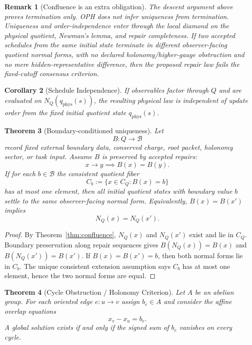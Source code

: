 \documentclass[11pt]{article}
\newtheorem{theorem}{Theorem}[section]
\newtheorem{corollary}[theorem]{Corollary}
\newtheorem{remark}[theorem]{Remark}
\begin{document}
\begin{remark}[Confluence is an extra obligation]
The descent argument above proves termination only. OPH does not infer uniqueness from termination.
Uniqueness and order-independence enter through the local diamond on the physical quotient, Newman's
lemma, and repair completeness. If two accepted schedules from the same initial state terminate in
different observer-facing quotient normal forms, with no declared holonomy/higher-gauge obstruction
and no mere hidden-representative difference, then the proposed repair law fails the fixed-cutoff
consensus criterion.
\end{remark}

\begin{corollary}[Schedule Independence]
If observables factor through \(Q\) and are evaluated on \(N_Q(q_{\mathrm{phys}}(s))\), the
resulting physical law is independent of update order from the fixed initial quotient state
\(q_{\mathrm{phys}}(s)\).
\end{corollary}

\begin{theorem}[Boundary-conditioned uniqueness]\label{thm:boundary-conditioned-uniqueness}
Let
\[
B:Q\to\mathcal B
\]
record fixed external boundary data, conserved charge, root packet, holonomy sector, or task
input. Assume \(B\) is preserved by accepted repairs:
\[
x\to y\implies B(x)=B(y).
\]
If for each \(b\in\mathcal B\) the consistent quotient fiber
\[
C_b:=\{x\in C_Q:B(x)=b\}
\]
has at most one element, then all initial quotient states with boundary value \(b\) settle to the
same observer-facing normal form. Equivalently, \(B(x)=B(x')\) implies
\[
N_Q(x)=N_Q(x').
\]
\end{theorem}

\begin{proof}
By Theorem~\ref{thm:confluence}, \(N_Q(x)\) and \(N_Q(x')\) exist and lie in \(C_Q\). Boundary
preservation along repair sequences gives \(B(N_Q(x))=B(x)\) and
\(B(N_Q(x'))=B(x')\). If \(B(x)=B(x')=b\), then both normal forms lie in \(C_b\). The unique
consistent extension assumption says \(C_b\) has at most one element, hence the two normal forms
are equal.
\end{proof}

\begin{theorem}[Cycle Obstruction / Holonomy Criterion]\label{thm:holonomy}
Let $A$ be an abelian group. For each oriented edge $e:u\to v$ assign $b_e\in A$ and consider the affine overlap equations
\[
x_v-x_u=b_e.
\]
A global solution exists if and only if the signed sum of $b_e$ vanishes on every cycle.
\end{theorem}
\end{document}
